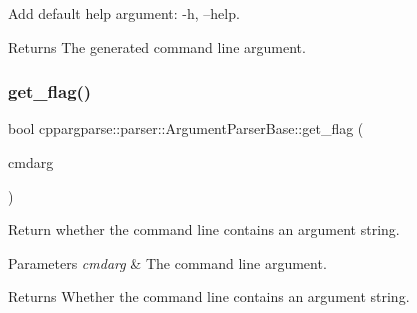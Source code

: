 Add default help argument\+: -\/h, --help. 

\begin{DoxyReturn}{Returns}
The generated command line argument. 
\end{DoxyReturn}
\mbox{\label{classcppargparse_1_1parser_1_1ArgumentParserBase_aa95fba161ea60c65972e76025419b8d9}} 
\subsubsection{\texorpdfstring{get\+\_\+flag()}{get\_flag()}}
{\footnotesize\ttfamily bool cppargparse\+::parser\+::\+Argument\+Parser\+Base\+::get\+\_\+flag (\begin{DoxyParamCaption}\item[{const \hyperlink{structcppargparse_1_1types_1_1CommandLineArgument__t}{types\+::\+Command\+Line\+Argument\+\_\+t} \&}]{cmdarg }\end{DoxyParamCaption})\hspace{0.3cm}{\ttfamily [inline]}}



Return whether the command line contains an argument string. 


\begin{DoxyParams}{Parameters}
{\em cmdarg} & The command line argument.\\
\hline
\end{DoxyParams}
\begin{DoxyReturn}{Returns}
Whether the command line contains an argument string. 
\end{DoxyReturn}
\mbox{\label{classcppargparse_1_1parser_1_1ArgumentParserBase_ae26532c710a553810a784d2243572e34}} 
